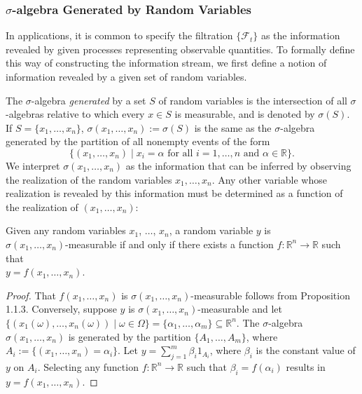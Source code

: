 \documentclass[\topdir/lecture\_notes.tex]{subfiles}
\begin{document}
\subsubsection{\(\sigma\)-algebra Generated by Random Variables}
In applications, it is common to specify the filtration \(\{\mathcal{F}_{t}\}\) as the information revealed by given processes representing observable quantities. To formally define this way of constructing the information stream, we first define a notion of information revealed by a given set of random variables.

The \(\sigma\)-algebra \emph{generated} by a set \(S\) of random variables is the intersection of all \(\sigma\)-algebras relative to which every \(x \in S\) is measurable, and is denoted by \(\sigma(S)\). If \(S=\{x_{1}, \ldots, x_{n}\}\), \(\sigma(x_{1}, \ldots, x_{n}) := \sigma(S)\) is the same as the \(\sigma\)-algebra generated by the partition of all nonempty events of the form 
\[
    \{(x_{1}, \ldots, x_{n}) \mid x_i = \alpha \text{ for all }i=1,\ldots,n \text{ and } \alpha \in \mathbb{R}\}.
\]
We interpret \(\sigma(x_{1}, \ldots, x_{n})\) as the information that can be inferred by observing the realization of the random variables \(x_{1}, \ldots, x_{n}\). Any other variable whose realization is revealed by this information must be determined as a function of the realization of \((x_{1}, \ldots, x_{n})\):

\begin{proposition} \label{prop:measurable_function_characterization}
Given any random variables \(x_{1}\), \(\ldots\), \(x_{n}\), a random variable \(y\) is \\
\(\sigma(x_{1},\ldots, x_{n})\)-measurable if and only if there exists a function \(f: \mathbb{R}^{n} \rightarrow \mathbb{R}\) such that \\
\(y=f(x_{1}, \ldots, x_{n})\).
\end{proposition}
\begin{proof}
That \(f(x_{1}, \ldots, x_{n})\) is \(\sigma(x_{1}, \ldots, x_{n})\)-measurable follows from Proposition 1.1.3. Conversely, suppose \(y\) is \(\sigma(x_{1}, \ldots, x_{n})\)-measurable and let \(\{(x_{1}(\omega), \ldots, x_{n}(\omega)) \mid \omega \in \Omega\}=\{\alpha_{1}, \ldots, \alpha_{m}\} \subseteq \mathbb{R}^{n}\). The \(\sigma\)-algebra \(\sigma(x_{1}, \ldots, x_{n})\) is generated by the partition \(\{A_{1}, \ldots, A_{m}\}\), where
\(A_{i} :=\{(x_{1}, \ldots, x_{n})=\alpha_{i}\}\). Let \(y=\sum_{j=1}^{m} \beta_{i} 1_{A_{i}}\), where \(\beta_{i}\) is the constant value of \(y\) on \(A_{i}\). Selecting any function \(f: \mathbb{R}^{n} \rightarrow \mathbb{R}\) such that \(\beta_{i}=f(\alpha_{i})\) results in \(y=f(x_{1}, \ldots, x_{n})\).
\end{proof}
\end{document}
